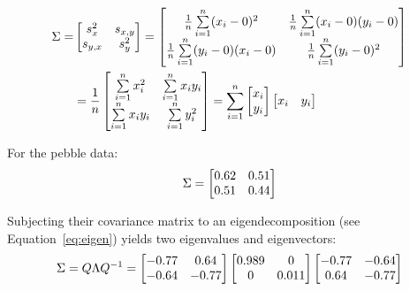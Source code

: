 \begin{equation}
  \begin{split}
  \Sigma = &
  \left[
    \begin{array}{@{}cc@{}}
      s_x^2 & s_{x,y} \\
      s_{y,x} & s_y^2
    \end{array}
    \right] =
  \left[
    \begin{array}{@{}cc@{}}
      \frac{1}{n}\sum\limits_{i=1}^{n} (x_i-0)^2 & 
      \frac{1}{n}\sum\limits_{i=1}^{n} (x_i-0)(y_i-0) \\
      \frac{1}{n}\sum\limits_{i=1}^{n} (y_i-0)(x_i-0) &
      \frac{1}{n}\sum\limits_{i=1}^{n} (y_i-0)^2
    \end{array}
    \right] \\
  ~ & =
  \frac{1}{n}
  \left[
    \begin{array}{@{}cc@{}}
      \sum\limits_{i=1}^{n} x_i^2 & 
      \sum\limits_{i=1}^{n} x_iy_i \\
      \sum\limits_{i=1}^{n} x_iy_i &
      \sum\limits_{i=1}^{n} y_i^2
    \end{array}
    \right] =
  \sum\limits_{i=1}^{n}
  \left[
    \begin{array}{@{}c@{}}
      x_i \\ y_i
    \end{array}
    \right]
  \left[
    \begin{array}{@{}cc@{}}
      x_i & y_i
    \end{array}
    \right]
  \end{split}
\end{equation}

For the pebble data:
\[
\Sigma =
\left[
  \begin{array}{@{}cc@{}}
    0.62 & 0.51 \\
    0.51 & 0.44
  \end{array}
  \right]
\]
    
Subjecting their covariance matrix to an eigendecomposition (see
Equation~\ref{eq:eigen}) yields two eigenvalues and eigenvectors:
\[
\Sigma = Q \Lambda Q^{-1} =
\left[
  \begin{array}{@{}cc@{}}
    -0.77 & 0.64 \\
    -0.64 & -0.77
  \end{array}
  \right]
\left[
  \begin{array}{@{}cc@{}}
    0.989  & 0 \\
    0 & 0.011
  \end{array}
  \right]
\left[
  \begin{array}{@{}cc@{}}
    -0.77 & -0.64 \\
    0.64 & -0.77
  \end{array}
  \right]
\]


